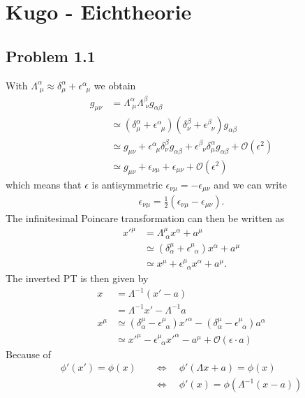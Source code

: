 \documentclass[10pt,a4paper]{book}
\theoremstyle{definition}
\begin{document}
\newpage
\section{{\sc Kugo} - Eichtheorie}
\subsection{Problem 1.1}
With $\Lambda^\alpha_{\;\mu}\approx\delta^\alpha_\mu+\epsilon^\alpha_{\;\;\mu}$ we obtain
\begin{align}
g_{\mu\nu}
&=\Lambda^\alpha_{\;\mu}\Lambda^\beta_{\;\nu}g_{\alpha\beta}\\
&\simeq\left(\delta^\alpha_\mu+\epsilon^\alpha_{\;\;\mu}\right)\left(\delta^\beta_\nu+\epsilon^\beta_{\;\;\nu}\right)g_{\alpha\beta}\\
&\simeq g_{\mu\nu}+\epsilon^\alpha_{\;\;\mu}\delta^\beta_\nu g_{\alpha\beta}+\epsilon^\beta_{\;\;\nu}\delta^\alpha_\mu g_{\alpha\beta}+\mathcal{O}(\epsilon^2)\\
&\simeq g_{\mu\nu}+\epsilon_{\nu\mu}+\epsilon_{\mu\nu}+\mathcal{O}(\epsilon^2)
\end{align}
which means that $\epsilon$ is antisymmetric $\epsilon_{\nu\mu}=-\epsilon_{\mu\nu}$ and we can write
\begin{align}
\epsilon_{\nu\mu}=\frac{1}{2}\left(\epsilon_{\nu\mu}-\epsilon_{\mu\nu}\right).
\end{align}
The infinitesimal Poincare transformation can then be written as
\begin{align}
x'^\mu
&=\Lambda^\mu_{\;\alpha}x^\alpha+a^\mu\\
&\simeq\left(\delta^\mu_\alpha+\epsilon^\mu_{\;\;\alpha}\right)x^\alpha+a^\mu\\
&\simeq x^\mu+\epsilon^\mu_{\;\;\alpha}x^\alpha+a^\mu.
\end{align}
The inverted PT is then given by
\begin{align}
x&=\Lambda^{-1}(x'-a)\\
&=\Lambda^{-1}x'-\Lambda^{-1}a\\
x^\mu&\simeq\left(\delta^\mu_\alpha-\epsilon^\mu_{\;\;\alpha}\right)x'^\alpha-\left(\delta^\mu_\alpha-\epsilon^\mu_{\;\;\alpha}\right)a^\alpha\\
&\simeq x'^\mu-\epsilon^\mu_{\;\;\alpha}x'^\alpha-a^\mu+\mathcal{O}(\epsilon\cdot a)
\end{align}
Because of 
\begin{align}
\phi'(x')=\phi(x)
&\quad\Leftrightarrow\quad\phi'(\Lambda x+a)=\phi(x)\\
&\quad\Leftrightarrow\quad\phi'(x)=\phi(\Lambda^{-1}(x-a))
\end{align}
\end{document}
